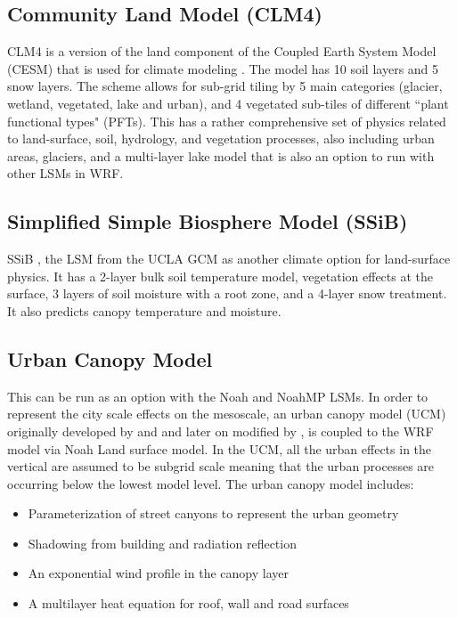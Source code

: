 \subsection{Community Land Model (CLM4)}

CLM4 is a version of the land component of the Coupled Earth System Model (CESM) that is used for climate modeling \citep{oleson10, lawrence11}. 
The model has 10 soil layers and 5 snow layers.
The scheme allows for sub-grid tiling by 5 main categories (glacier, wetland, vegetated, lake and urban), and 4 vegetated sub-tiles of different ``plant functional types" (PFTs).
This has a rather comprehensive set of physics related to land-surface, soil, hydrology, and vegetation processes, also including urban areas, glaciers, and a multi-layer lake
model that is also an option to run with other LSMs in WRF.

\subsection{Simplified Simple Biosphere Model (SSiB)}

SSiB \citep{xue91, sun01}, the LSM from the UCLA GCM as another climate option for land-surface physics. It has a 2-layer bulk soil temperature model,
vegetation effects at the surface, 3 layers of soil moisture with a root zone, and a 4-layer snow treatment. It also predicts canopy temperature and moisture.

\subsection{Urban Canopy Model}

This can be run as an option with the Noah and NoahMP LSMs.
In order to represent the city scale effects on the mesoscale,
an urban canopy model (UCM) originally developed by \citet{kusaka01}
and \citet{kusaka04} and later on modified
by \citet{chen06}, is coupled to the WRF model via
Noah Land surface model. In the UCM, all the urban effects in the
vertical are assumed to be subgrid scale meaning that the urban
processes are occurring below the lowest model level. The urban
canopy model includes:
\begin{itemize}\setlength{\parskip}{-4pt}
\item Parameterization of street canyons to represent the urban
geometry
\item  Shadowing from building and radiation reflection
\item  An exponential wind profile in the canopy layer
\item A multilayer heat equation for roof, wall and road surfaces
\end{itemize}

